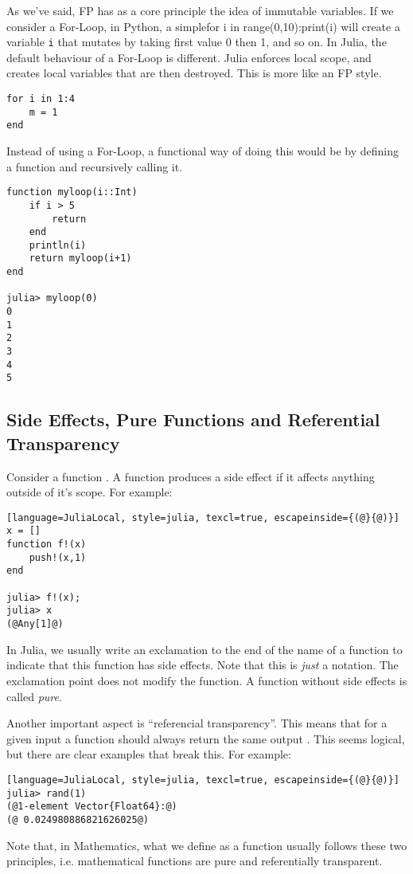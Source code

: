 As we've said, FP has as a core principle the idea of immutable variables.
If we consider a For-Loop, in Python, a simple\lstinline[style=julia]{}\lstinline[style=julia]{}for i in range(0,10):print(i)\lstinline[style=julia]{}\lstinline[style=julia]{}
will create a variable \lstinline[style=julia]{i} that mutates by taking first value 0 then 1, and so on.
In Julia, the default behaviour of a For-Loop is different. Julia enforces local scope,
and creates local variables that are then destroyed. This is more like an FP style.
\bigskip
\begin{lstlisting}[language=JuliaLocal, style=julia, texcl=false]
for i in 1:4
    m = 1
end
\end{lstlisting}
Instead of using a For-Loop, a functional way of doing this would be by defining a function and recursively calling it.
\bigskip
\begin{lstlisting}[language=JuliaLocal, style=julia, texcl=true]
function myloop(i::Int)
    if i > 5
        return
    end
    println(i)
    return myloop(i+1)
end

julia> myloop(0)
0
1
2
3
4
5
\end{lstlisting}

\subsection{Side Effects, Pure Functions and Referential Transparency}


Consider a function . A function produces a side effect if it affects anything outside of it's scope. For example:
\bigskip
\begin{lstlisting}[language=JuliaLocal, style=julia, texcl=true, escapeinside={(@}{@)}]
x = []
function f!(x)
    push!(x,1)
end

julia> f!(x);
julia> x
(@Any[1]@)
\end{lstlisting}

In Julia, we usually write an exclamation to the end of the name of a function
to indicate that this function has side effects.
Note that this is \textit{just} a notation.
The exclamation point does not modify the function.
A function without side effects is called \textit{pure}.

Another important aspect is ``referencial transparency''.
This means that for a given input  a function should always return the same output .
This seems logical, but there are clear examples that break this. For example:
\bigskip
\begin{lstlisting}[language=JuliaLocal, style=julia, texcl=true, escapeinside={(@}{@)}]
julia> rand(1)
(@1-element Vector{Float64}:@)
(@ 0.024980886821626025@)
\end{lstlisting}
Note that, in Mathematics,
what we define as a function usually follows these two principles,
i.e. mathematical functions are pure and referentially transparent.

